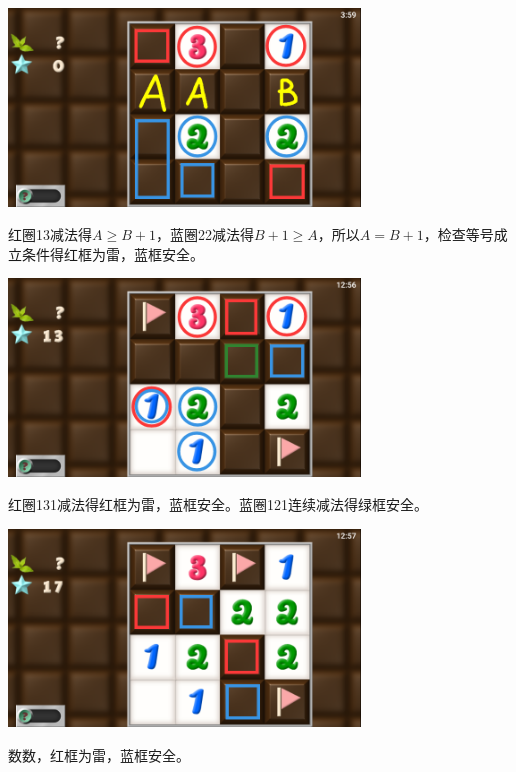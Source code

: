 \subsection{} %
\begin{center}
    \includegraphics[width=0.7\textwidth]{puzzle/138-1.png}
\end{center}
红圈13减法得$A\ge B+1$，蓝圈22减法得$B+1\ge A$，所以$A=B+1$，检查等号成立条件得红框为雷，蓝框安全。
\begin{center}
    \includegraphics[width=0.7\textwidth]{puzzle/138-2.png}
\end{center}
红圈131减法得红框为雷，蓝框安全。蓝圈121连续减法得绿框安全。
\begin{center}
    \includegraphics[width=0.7\textwidth]{puzzle/138-3.png}
\end{center}
数数，红框为雷，蓝框安全。


